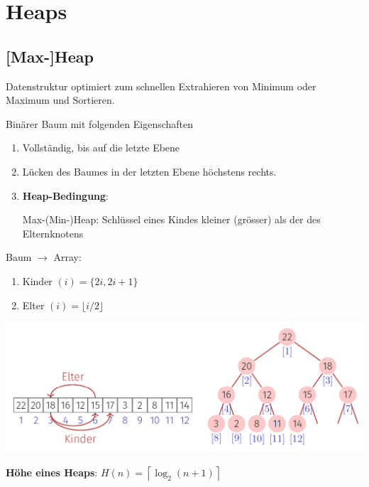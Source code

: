 \section{Heaps}

\begin{sectionbox}
\subsection{[Max-]Heap}\smallskip
Datenstruktur optimiert zum schnellen Extrahieren von Minimum oder Maximum und Sortieren.\par\smallskip

Binärer Baum mit folgenden Eigenschaften\par
\begin{enumerate}
    \item Vollständig, bis auf die letzte Ebene
    \item Lücken des Baumes in der letzten Ebene höchstens rechts.
    \item \textbf{Heap-Bedingung}:
    \par Max-(Min-)Heap: Schlüssel eines Kindes kleiner (grösser) als der des Elternknotens
\end{enumerate}\smallskip

Baum $\rightarrow$ Array:
\begin{enumerate}
    \item Kinder $(i)=\{2 i, 2 i+1\}$
    \item Elter $(i)=\lfloor i / 2\rfloor$
\end{enumerate}\smallskip

\includegraphics[width = \columnwidth]{../img/heaps.png}\smallskip

\textbf{Höhe eines Heaps}: $H(n)=\left\lceil\log _{2}(n+1)\right\rceil$\par\smallskip

\end{sectionbox}

